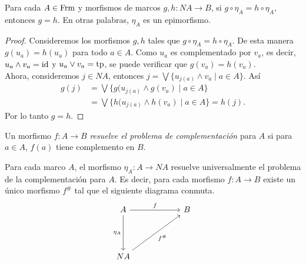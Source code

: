 \begin{lem}\label{Lema6.2.1}
    Para cada $A\in \mathrm{Frm}$ y morfismos de marcos $g, h\colon NA\to B$, si $g\circ \eta_A=h\circ \eta_A$, entonces $g=h$. En otras palabras, $\eta_A$ es un epimorfismo.
\end{lem}

\begin{proof}
    Consideremos los morfismos $g, h$ tales que $g\circ \eta_A=h\circ \eta_A$. De esta manera $g(u_a)=h(u_a)$ para todo $a\in A$. Como $u_a$ es complementado por $v_a$, es decir, $u_a\wedge v_a=\mathrm{id}$ y $u_a\vee v_a=\mathrm{tp}$, se puede verificar que $g(v_a)=h(v_a)$.\\

    Ahora, consideremos $j\in NA$, entonces 
    $j=\bigvee\{u_{j(a)}\wedge v_a\mid a\in A\}$. Así
    \[
    \begin{split}
    g(j)& =\bigvee\{g(u_{j(a)}\wedge g(v_a)\mid a\in A\}
    \\
    & =\bigvee\{h(u_{j(a)}\wedge h(v_a)\mid a\in A\}=h(j).
    \end{split}
    \]
    Por lo tanto $g=h$.
\end{proof}

Un morfismo $f\colon A\to B$ \emph{resuelve el problema de complementación} para $A$ si para $a\in A$, $f(a)$ tiene complemento en $B$.

\begin{thm}\label{Teorema6.2.2}
    Para cada marco $A$, el morfismo $\eta_A\colon A\to NA$ resuelve universalmente el problema de la complementación para $A$. Es decir, para cada morfismo $f\colon A\to B$ existe un único morfismo $f^\#$ tal que el siguiente diagrama conmuta.
    \[\begin{tikzcd}
	A && B \\
	& {} \\
	NA
	\arrow["f", from=1-1, to=1-3]
	\arrow["{\eta_A}"', from=1-1, to=3-1]
	\arrow["{f^\#}"', from=3-1, to=1-3]
\end{tikzcd}\]
\end{thm}

